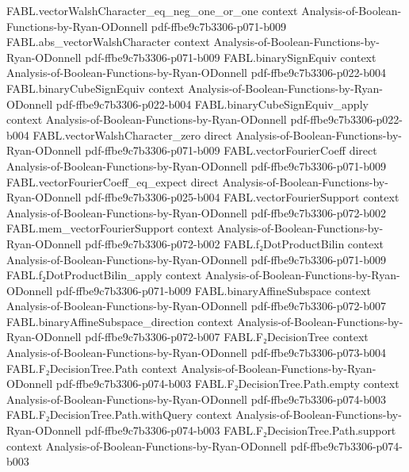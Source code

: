 \begin{theorem}
  {FABL.vectorWalshCharacter_eq_neg_one_or_one}
  {context}
  {Analysis-of-Boolean-Functions-by-Ryan-ODonnell}
  {pdf-ffbe9c7b3306-p071-b009}
\proofstep
  {FABL.abs_vectorWalshCharacter}
  {context}
  {Analysis-of-Boolean-Functions-by-Ryan-ODonnell}
  {pdf-ffbe9c7b3306-p071-b009}
\proofstep
  {FABL.binarySignEquiv}
  {context}
  {Analysis-of-Boolean-Functions-by-Ryan-ODonnell}
  {pdf-ffbe9c7b3306-p022-b004}
\proofstep
  {FABL.binaryCubeSignEquiv}
  {context}
  {Analysis-of-Boolean-Functions-by-Ryan-ODonnell}
  {pdf-ffbe9c7b3306-p022-b004}
\proofstep
  {FABL.binaryCubeSignEquiv_apply}
  {context}
  {Analysis-of-Boolean-Functions-by-Ryan-ODonnell}
  {pdf-ffbe9c7b3306-p022-b004}
\proofstep
  {FABL.vectorWalshCharacter_zero}
  {direct}
  {Analysis-of-Boolean-Functions-by-Ryan-ODonnell}
  {pdf-ffbe9c7b3306-p071-b009}
\proofstep
  {FABL.vectorFourierCoeff}
  {direct}
  {Analysis-of-Boolean-Functions-by-Ryan-ODonnell}
  {pdf-ffbe9c7b3306-p071-b009}
\proofstep
  {FABL.vectorFourierCoeff_eq_expect}
  {direct}
  {Analysis-of-Boolean-Functions-by-Ryan-ODonnell}
  {pdf-ffbe9c7b3306-p025-b004}
\proofstep
  {FABL.vectorFourierSupport}
  {context}
  {Analysis-of-Boolean-Functions-by-Ryan-ODonnell}
  {pdf-ffbe9c7b3306-p072-b002}
\proofstep
  {FABL.mem_vectorFourierSupport}
  {context}
  {Analysis-of-Boolean-Functions-by-Ryan-ODonnell}
  {pdf-ffbe9c7b3306-p072-b002}
\proofstep
  {FABL.f₂DotProductBilin}
  {context}
  {Analysis-of-Boolean-Functions-by-Ryan-ODonnell}
  {pdf-ffbe9c7b3306-p071-b009}
\proofstep
  {FABL.f₂DotProductBilin_apply}
  {context}
  {Analysis-of-Boolean-Functions-by-Ryan-ODonnell}
  {pdf-ffbe9c7b3306-p071-b009}
\proofstep
  {FABL.binaryAffineSubspace}
  {context}
  {Analysis-of-Boolean-Functions-by-Ryan-ODonnell}
  {pdf-ffbe9c7b3306-p072-b007}
\proofstep
  {FABL.binaryAffineSubspace_direction}
  {context}
  {Analysis-of-Boolean-Functions-by-Ryan-ODonnell}
  {pdf-ffbe9c7b3306-p072-b007}
\proofstep
  {FABL.F₂DecisionTree}
  {context}
  {Analysis-of-Boolean-Functions-by-Ryan-ODonnell}
  {pdf-ffbe9c7b3306-p073-b004}
\proofstep
  {FABL.F₂DecisionTree.Path}
  {context}
  {Analysis-of-Boolean-Functions-by-Ryan-ODonnell}
  {pdf-ffbe9c7b3306-p074-b003}
\proofstep
  {FABL.F₂DecisionTree.Path.empty}
  {context}
  {Analysis-of-Boolean-Functions-by-Ryan-ODonnell}
  {pdf-ffbe9c7b3306-p074-b003}
\proofstep
  {FABL.F₂DecisionTree.Path.withQuery}
  {context}
  {Analysis-of-Boolean-Functions-by-Ryan-ODonnell}
  {pdf-ffbe9c7b3306-p074-b003}
\proofstep
  {FABL.F₂DecisionTree.Path.support}
  {context}
  {Analysis-of-Boolean-Functions-by-Ryan-ODonnell}
  {pdf-ffbe9c7b3306-p074-b003}

\end{theorem}
